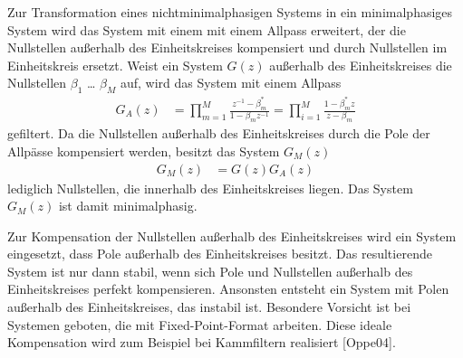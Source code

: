 Zur Transformation eines nichtminimalphasigen Systems in ein minimalphasiges System wird das System mit einem mit einem Allpass erweitert, der die Nullstellen außerhalb des Einheitskreises kompensiert und durch Nullstellen im Einheitskreis ersetzt. Weist ein System \(G(z)\) außerhalb des Einheitskreises die Nullstellen \(β_{1}\) \ldots{} \(β_{M}\) auf, wird das System mit einem Allpass
\begin{align}
G_{A}(z) &= \prod\limits_{m = 1}^{M}\frac{z^{- 1} - \beta_{m}^{*}}{1 - \beta_{m}  z^{- 1}} = \prod\limits_{i = 1}^{M}\frac{1 - \beta_{m}^{*}  z}{z - \beta_{m}} \label{eq:8.113}
\end{align}
gefiltert. Da die Nullstellen außerhalb des Einheitskreises durch die Pole der Allpässe kompensiert werden, besitzt das System \(G_{M}(z)\)
\begin{align}
G_{M}(z) &= G(z)  G_{A}(z) \label{eq:8.114}
\end{align}
lediglich Nullstellen, die innerhalb des Einheitskreises liegen. Das System \(G_{M}(z)\) ist damit minimalphasig.

Zur Kompensation der Nullstellen außerhalb des Einheitskreises wird ein System eingesetzt, dass Pole außerhalb des Einheitskreises besitzt. Das resultierende System ist nur dann stabil, wenn sich Pole und Nullstellen außerhalb des Einheitskreises perfekt kompensieren. Ansonsten entsteht ein System mit Polen außerhalb des Einheitskreises, das instabil ist. Besondere Vorsicht ist bei Systemen geboten, die mit Fixed-Point-Format arbeiten. Diese ideale Kompensation wird zum Beispiel bei Kammfiltern realisiert {[}Oppe04{]}.

